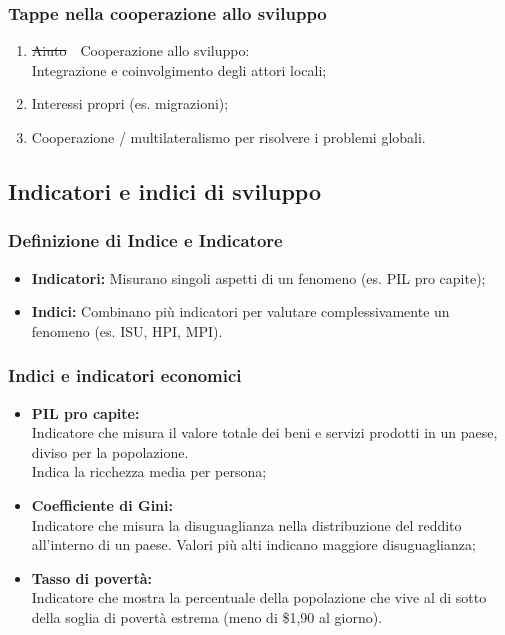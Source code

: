 \documentclass{article}
\begin{document}
\subsubsection{Tappe nella cooperazione allo sviluppo}
\begin{enumerate}
    \item \sout{Aiuto}\ \textrightarrow\ Cooperazione allo sviluppo:\\
        Integrazione e coinvolgimento degli attori locali;
    \item Interessi propri (es. migrazioni);
    \item Cooperazione / multilateralismo per risolvere i problemi globali.
\end{enumerate}

\subsection{Indicatori e indici di sviluppo}
\subsubsection{Definizione di Indice e Indicatore}
\begin{itemize}
    \item \textbf{Indicatori:} Misurano singoli aspetti di un fenomeno (es. PIL pro capite);
    \item \textbf{Indici:} Combinano più indicatori per valutare
        complessivamente un fenomeno (es. ISU, HPI, MPI).
\end{itemize}

\subsubsection{Indici e indicatori economici}
\begin{itemize}
    \item \textbf{PIL pro capite:}\\
        Indicatore che misura il valore totale dei beni e servizi prodotti in un paese, diviso
        per la popolazione.\\
        Indica la ricchezza media per persona;
    \item \textbf{Coefficiente di Gini:}\\
        Indicatore che misura la disuguaglianza nella distribuzione del reddito all'interno di
        un paese. Valori più alti indicano maggiore disuguaglianza;
    \item \textbf{Tasso di povertà:}\\
        Indicatore che mostra la percentuale della popolazione che vive al di sotto della
        soglia di povertà estrema (meno di \$1,90 al giorno).
\end{itemize}
\end{document}
